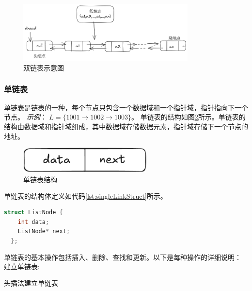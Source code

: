 \documentclass[lang=cn,newtx,10pt,scheme=chinese]{elegantbook}
\begin{document}
\begin{figure}[h]
  \centering
  \includegraphics[width=0.8\textwidth]{./image/doubleLink.png}
  \caption{双链表示意图}
  \label{fig:double_linked_list}
\end{figure}

\subsubsection{单链表}
单链表是链表的一种，每个节点只包含一个数据域和一个指针域，指针指向下一个节点。
\textit{示例}：
$L = \{1001 \rightarrow 1002 \rightarrow 1003\}$。
单链表的结构如图\ref{fig:singleLinkStruct}所示。单链表的结构由数据域和指针域组成，其中数据域存储数据元素，指针域存储下一个节点的地址。
\begin{figure}[h]
  \centering
  \includegraphics[width=0.6\textwidth]{./figure/pdf/cropped/singleStruct.pdf}
  \caption{单链表结构}
  \label{fig:singleLinkStruct}
\end{figure}
单链表的结构体定义如代码\ref{lst:singleLinkStruct}所示。
\begin{lstlisting}[language=C++, caption={单链表结构体定义}, label={lst:singleLinkStruct}]
  struct ListNode {
    int data;
    ListNode* next;
  };
\end{lstlisting}
单链表的基本操作包括插入、删除、查找和更新。以下是每种操作的详细说明：
建立单链表:

  头插法建立单链表
\end{document}
